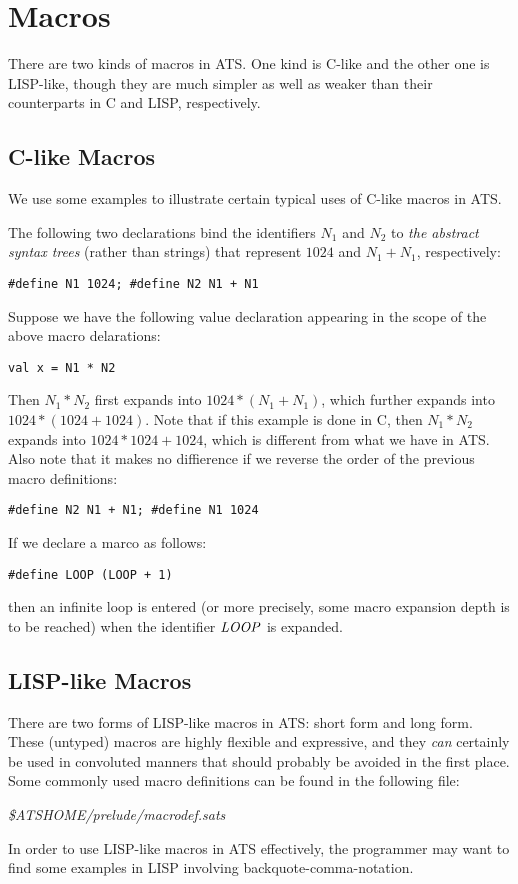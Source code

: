 \chapter{Macros}

There are two kinds of macros in ATS. One kind is C-like and the other one
is LISP-like, though they are much simpler as well as weaker than their
counterparts in C and LISP, respectively.

\section{C-like Macros}

We use some examples to illustrate certain typical uses of C-like macros in
ATS.

The following two declarations bind the identifiers $N_1$ and $N_2$ to {\em
the abstract syntax trees} (rather than strings) that represent $1024$ and
$N_1 + N_1$, respectively:
\begin{verbatim}
#define N1 1024; #define N2 N1 + N1
\end{verbatim}

Suppose we have the following value declaration appearing in the scope of
the above macro delarations:
\begin{verbatim}
val x = N1 * N2
\end{verbatim}

Then $N_1 * N_2$ first expands into $1024 * (N_1 + N_1)$, which further
expands into $1024 * (1024 + 1024)$. Note that if this example is done in
C, then $N_1 * N_2$ expands into $1024 * 1024 + 1024$, which is different
from what we have in ATS.  Also note that it makes no diffierence if we
reverse the order of the previous macro definitions:
\begin{verbatim}
#define N2 N1 + N1; #define N1 1024
\end{verbatim}
If we declare a marco as follows:
\begin{verbatim}
#define LOOP (LOOP + 1)
\end{verbatim}
then an infinite loop is entered (or more precisely, some macro expansion
depth is to be reached) when the identifier ${\it LOOP}$ is expanded.

\section{LISP-like Macros}
There are two forms of LISP-like macros in ATS: short form and long form.
These (untyped) macros are highly flexible and expressive, and they
{\em can} certainly be used in convoluted manners that should probably be
avoided in the first place. Some commonly used macro definitions can be
found in the following file:
\begin{center}
{\it \$ATSHOME/prelude/macrodef.sats}
\end{center}
In order to use LISP-like macros in ATS effectively, the programmer may
want to find some examples in LISP involving backquote-comma-notation.

